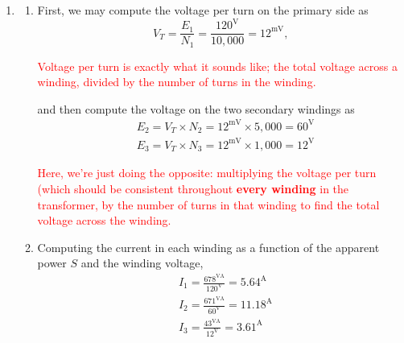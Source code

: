 \documentclass{article}
\begin{document}
\begin{enumerate}[label=\thesubsection]
\begin{enumerate}[label=\alph*)]
				\item Finding line current as a function of power on the load side, 
					\[
						I = \frac{12^{\mathrm{MVA}}}{(120 \times \sqrt{3})^{\mathrm{kV}}} = 57.74^{\mathrm{A}}. 
					\]

					\textcolor{red}{There are a couple different ways to do this, and the way I did it is not the intuitive way; it was just by using a weird formula I grabbed from the textbook. In actuality, it would make more sense to take the apparent power, \(S\), and divide it by 3 to get the power of a single transformer (since we're only looking for the current on one line \(\to\) one transformer \(\to\) one secondary winding. Then, we may divide that value by the line-to-neutral voltage, found by dividing line-to-line voltage by \(\sqrt{3}\). In other words (numbers),
					\[
						I_L = \frac{S/3}{V_{AB}/\sqrt{3}} = \frac{4^{\mathrm{MVA}}}{69.28^{\mathrm{kV}}} = 57.74^{\mathrm{A}}.
					\]}

			\end{enumerate}
			\setcounter{subsection}{11}
			\item
			\begin{enumerate}[label=\alph*)]
				\item First, we may compute the voltage per turn on the primary side as
					\[
						V_{T} = \frac{E_1}{N_1} = \frac{120^{\mathrm{V}}}{10,000} = 12^{\mathrm{mV}},
					\]

					\textcolor{red}{Voltage per turn is exactly what it sounds like; the total voltage across a winding, divided by the number of turns in the winding.}

					and then compute the voltage on the two secondary windings as 
					\begin{align*}
						&E_2 = V_T \times N_2 = 12^{\mathrm{mV}} \times 5,000 = 60^{\mathrm{V}} \\
						&E_3 = V_T \times N_3 = 12^{\mathrm{mV}} \times 1,000 = 12^{\mathrm{V}}
					\end{align*}
					
					\textcolor{red}{Here, we're just doing the opposite: multiplying the voltage per turn (which should be consistent throughout \textbf{every winding} in the transformer, by the number of turns in that winding to find the total voltage across the winding.}

				\item Computing the current in each winding as a function of the apparent power \(S\) and the winding voltage, 
					\begin{align*}
						&I_1 = \frac{678^{\mathrm{VA}}}{120^{\mathrm{V}}} = 5.64^{\mathrm{A}}\\
						&I_2 = \frac{671^{\mathrm{VA}}}{60^{\mathrm{V}}} = 11.18^{\mathrm{A}}\\
						&I_3 = \frac{43^{\mathrm{VA}}}{12^{\mathrm{V}}} = 3.61^{\mathrm{A}}\\
					\end{align*}
			\end{enumerate}


\end{enumerate}
\end{document}
